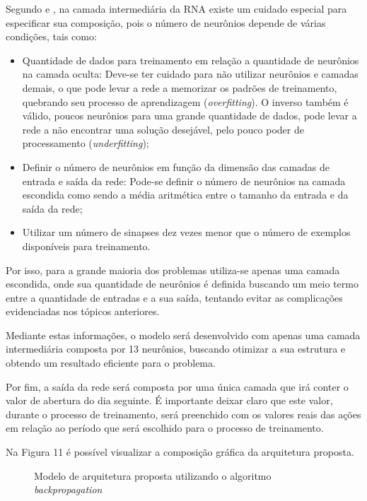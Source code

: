 Segundo  e , na camada intermediária da RNA existe um cuidado especial para especificar sua composição, pois o número de neurônios depende de várias condições, tais como:

\begin{itemize}
\item Quantidade de dados para treinamento em relação a quantidade de neurônios na camada oculta: Deve-se ter cuidado para não utilizar neurônios e camadas demais, o que pode levar a rede a memorizar os padrões de treinamento, quebrando seu processo de aprendizagem (\textit{overfitting}). O inverso também é válido, poucos neurônios para uma grande quantidade de dados, pode levar a rede a não encontrar uma solução desejável, pelo pouco poder de processamento (\textit{underfitting});
\item Definir o número de neurônios em função da dimensão das camadas de entrada e saída da rede: Pode-se definir o número de neurônios na camada escondida como sendo a média aritmética entre o tamanho da entrada e da saída da rede;
\item Utilizar um número de sinapses dez vezes menor que o número de exemplos disponíveis para treinamento.
\end{itemize}

Por isso, para a grande maioria dos problemas utiliza-se apenas uma camada escondida, onde sua quantidade de neurônios é definida buscando um meio termo entre a quantidade de entradas e a sua saída, tentando evitar as complicações evidenciadas nos tópicos anteriores.

Mediante estas informações, o modelo será desenvolvido com apenas uma camada intermediária composta por 13 neurônios, buscando otimizar a sua estrutura e obtendo um resultado eficiente para o problema.

Por fim, a saída da rede será composta por uma única camada que irá conter o valor de abertura do dia seguinte. É importante deixar claro que este valor, durante o processo de treinamento, será preenchido com os valores reais das ações em relação ao período que será escolhido para o processo de treinamento.

Na Figura 11 é possível visualizar a composição gráfica da arquitetura proposta.

\begin{figure}[h]
	\centering
	\caption{Modelo de arquitetura proposta utilizando o algoritmo \textit{backpropagation}}
	\label{exec-rna}
\end{figure}

